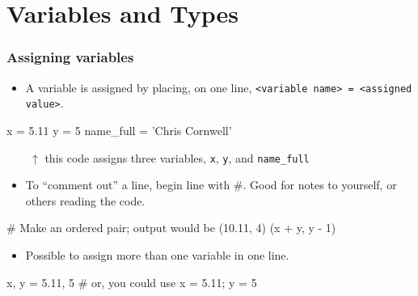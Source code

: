 \documentclass{beamer}
\newenvironment{codeblock}
    {\hfill\begin{beamerboxesrounded}[lower=codecol, width=0.8\textwidth]
    \medskip

    }
    { 
    \end{beamerboxesrounded}\hfill
    }
\theoremstyle{example}
\newcommand{\ct}[1]{\lstinline[language=Python]!#1!}
\newcommand{\ttt}[1]{\texttt{#1}}
\begin{document}
\section{Variables and Types}

\begin{frame}[fragile]
\frametitle{Assigning variables}

\begin{itemize}
	\item A variable is assigned by placing, on one line, \mbox{\ttt{<variable name> = <assigned value>}.}
\end{itemize}
\begin{codeblock}

\begin{python}
x = 5.11
y = 5
name_full = 'Chris Cornwell'
\end{python}

\end{codeblock}

$\qquad\uparrow$ this code assigns three variables, \ttt{x}, \ttt{y}, and \ttt{name}\ct{_}\ttt{full}

\pause
\begin{itemize}
	\item To ``comment out'' a line, begin line with \#. Good for notes to yourself, or others reading the code.
\end{itemize}

\begin{codeblock}

\begin{python}
# Make an ordered pair; output would be (10.11, 4)
(x + y, y - 1)
\end{python}

\end{codeblock}

\pause
\begin{itemize}
	\item Possible to assign more than one variable in one line.
\end{itemize}

\begin{codeblock}

\begin{python}
x, y = 5.11, 5
# or, you could use 
x = 5.11; y = 5
\end{python}

\end{codeblock}
\end{frame}
\end{document}
